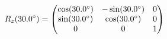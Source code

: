 \documentclass[preview]{standalone}
\begin{document}
\begin{align*}
\special{dvisvgm:raw <g id='unique000'>}R_z(30.0^\circ) = \begin{pmatrix} \cos(30.0^\circ) & -\sin(30.0^\circ) & 0 \\ \sin(30.0^\circ) & \cos(30.0^\circ) & 0 \\ 0 & 0 & 1 \end{pmatrix}\special{dvisvgm:raw </g>}
\end{align*}
\end{document}
